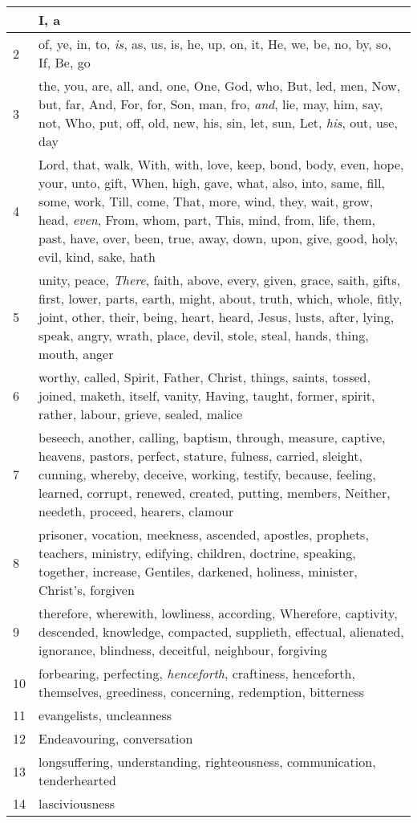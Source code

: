 \begin{center}
\begin{longtable}{l|p{3.75in}}
\hline \hline 
\endlastfoot 
1 & I, a\\ \hline 
2 & of, ye, in, to, \emph{is}, as, us, is, he, up, on, it, He, we, be, no, by, so, If, Be, go\\ \hline 
3 & the, you, are, all, and, one, One, God, who, But, led, men, Now, but, far, And, For, for, Son, man, fro, \emph{and}, lie, may, him, say, not, Who, put, off, old, new, his, sin, let, sun, Let, \emph{his}, out, use, day\\ \hline 
4 & Lord, that, walk, With, with, love, keep, bond, body, even, hope, your, unto, gift, When, high, gave, what, also, into, same, fill, some, work, Till, come, That, more, wind, they, wait, grow, head, \emph{even}, From, whom, part, This, mind, from, life, them, past, have, over, been, true, away, down, upon, give, good, holy, evil, kind, sake, hath\\ \hline 
5 & unity, peace, \emph{There}, faith, above, every, given, grace, saith, gifts, first, lower, parts, earth, might, about, truth, which, whole, fitly, joint, other, their, being, heart, heard, Jesus, lusts, after, lying, speak, angry, wrath, place, devil, stole, steal, hands, thing, mouth, anger\\ \hline 
6 & worthy, called, Spirit, Father, Christ, things, saints, tossed, joined, maketh, itself, vanity, Having, taught, former, spirit, rather, labour, grieve, sealed, malice\\ \hline 
7 & beseech, another, calling, baptism, through, measure, captive, heavens, pastors, perfect, stature, fulness, carried, sleight, cunning, whereby, deceive, working, testify, because, feeling, learned, corrupt, renewed, created, putting, members, Neither, needeth, proceed, hearers, clamour\\ \hline 
8 & prisoner, vocation, meekness, ascended, apostles, prophets, teachers, ministry, edifying, children, doctrine, speaking, together, increase, Gentiles, darkened, holiness, minister, Christ's, forgiven\\ \hline 
9 & therefore, wherewith, lowliness, according, Wherefore, captivity, descended, knowledge, compacted, supplieth, effectual, alienated, ignorance, blindness, deceitful, neighbour, forgiving\\ \hline 
10 & forbearing, perfecting, \emph{henceforth}, craftiness, henceforth, themselves, greediness, concerning, redemption, bitterness\\ \hline 
11 & evangelists, uncleanness\\ \hline 
12 & Endeavouring, conversation\\ \hline 
13 & longsuffering, understanding, righteousness, communication, tenderhearted\\ \hline 
14 & lasciviousness\\ \hline 
\end{longtable} 
\end{center} 




 
